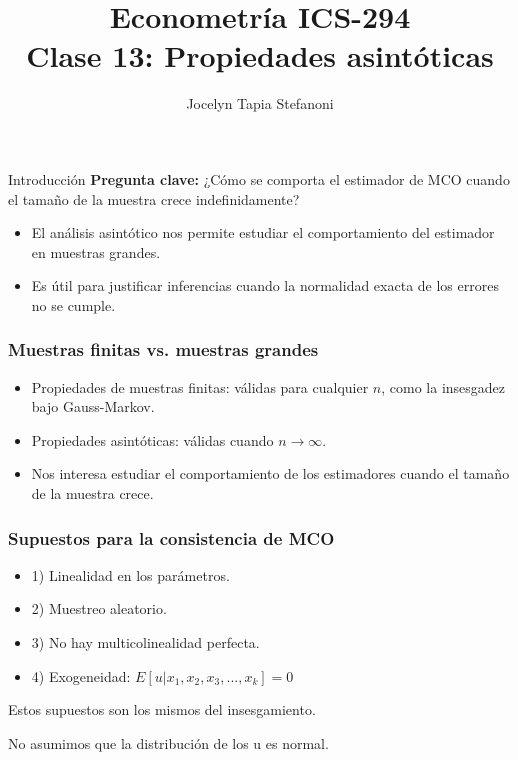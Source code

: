 \documentclass{beamer}
\title[ICS-162]{Econometría ICS-294\\ \small{Clase 13: Propiedades asintóticas  }}
\author{Jocelyn Tapia Stefanoni}
\institute[USM]
{Universidad Técnica Federico Santa María\\ %
	\medskip
	\textit{} %
	
}
\date{}
\begin{document}
    
\begin{frame}
	\titlepage %


\end{frame}
\logo{}





\begin{frame}{Introducción}
    \textbf{Pregunta clave:} ¿Cómo se comporta el estimador de MCO cuando el tamaño de la muestra crece indefinidamente? 
    \begin{itemize}
        \item El análisis asintótico nos permite estudiar el comportamiento del estimador en muestras grandes.
        \item Es útil para justificar inferencias cuando la normalidad exacta de los errores no se cumple.
    \end{itemize}
\end{frame}

\begin{frame}
\frametitle{Muestras finitas vs. muestras grandes}
\begin{itemize}
    \item Propiedades de muestras finitas: válidas para cualquier \(n\), como la insesgadez bajo Gauss-Markov.
    \item Propiedades asintóticas: válidas cuando \(n \to \infty\).
    \item Nos interesa estudiar el comportamiento de los estimadores cuando el tamaño de la muestra crece.
\end{itemize}
\end{frame}

\begin{frame}
\frametitle{Supuestos para la consistencia de MCO}
\begin{itemize}
\item 1) Linealidad en los parámetros.
    \item 2) Muestreo aleatorio.
    \item 3) No hay multicolinealidad perfecta. 
    \item 4) Exogeneidad: $E[u | x_1, x_2, x_3, ..., x_k] = 0$
    
\end{itemize}

Estos supuestos son los mismos del insesgamiento. 

No asumimos que la distribución de los u es normal.
\end{frame}
\end{document}
